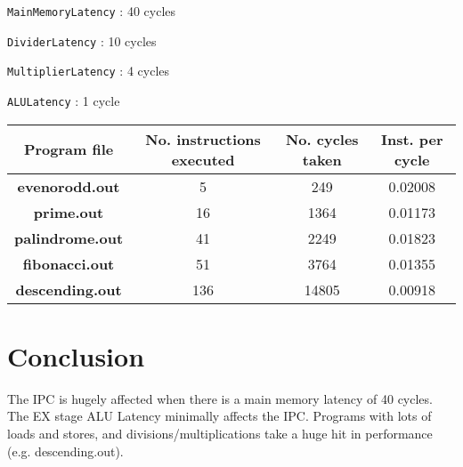 \documentclass[12pt,a4paper]{article}
\begin{document}
\texttt{MainMemoryLatency} : 40 cycles

\texttt{DividerLatency} : 10 cycles 

\texttt{MultiplierLatency} : 4 cycles 

\texttt{ALULatency} : 1 cycle

\begin{table}[!ht]
	\begin{tabular}{|c|c|c|c|}
		\hline
		\textbf{Program file} & \textbf{No. instructions executed} & \textbf{No. cycles taken} & \textbf{Inst. per cycle} \\
		\hline
		\textbf{evenorodd.out} & 5 & 249 & 0.02008 \\
		\textbf{prime.out} & 16 & 1364 & 0.01173 \\
		\textbf{palindrome.out} & 41 & 2249 & 0.01823 \\
		\textbf{fibonacci.out} & 51 & 3764 & 0.01355 \\
		\textbf{descending.out} & 136 & 14805 & 0.00918 \\
		\hline
	\end{tabular}
\end{table}

\section{Conclusion}
The IPC is hugely affected when there is a main memory latency of 40 cycles. The EX stage ALU Latency minimally affects the IPC. Programs with lots of loads and stores, and divisions/multiplications take a huge hit in performance (e.g. descending.out).
\end{document}
